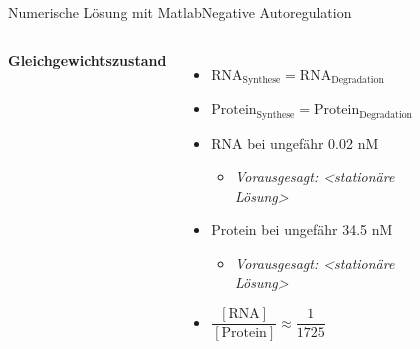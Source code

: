 \documentclass[11pt,aspectratio=169,reqno]{beamer}
\begin{document}
\begin{frame}{Numerische Lösung mit Matlab\hfill {\small Negative Autoregulation}}
    \begin{columns}
            \textbf{Gleichgewichtszustand}\\[1em]
            
            \begin{itemize}
                \item $\text{RNA}_\text{Synthese}=\text{RNA}_\text{Degradation}$
                \item $\text{Protein}_\text{Synthese}=\text{Protein}_\text{Degradation}$
                \vspace{1em}
                \item RNA bei ungefähr 0.02 nM
                \begin{itemize}
                    \item \emph{\tiny Vorausgesagt: <stationäre Lösung>}
                \end{itemize}
                \item Protein bei ungefähr 34.5 nM
                \begin{itemize}
                    \item \emph{\tiny Vorausgesagt: <stationäre Lösung>}
                \end{itemize}

                \item $\dfrac{[\text{RNA}]}{[\text{Protein}]}\approx \dfrac{1}{1725}$
            \end{itemize}
        
        \begin{figure}
            \centering
            \includegraphics[width=\linewidth]{images/simulations/negative_autoregulation_basic.m.png}
        \end{figure}
    \end{columns}
\end{frame}
\end{document}
